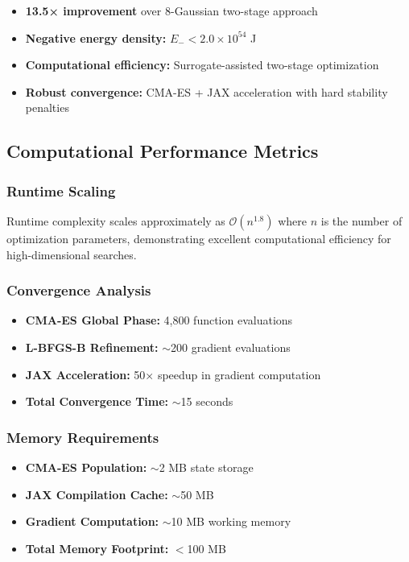 \documentclass[11pt]{article}
\begin{document}
\begin{itemize}
\item \textbf{13.5× improvement} over 8-Gaussian two-stage approach
\item \textbf{Negative energy density:} $E_- < 2.0\times10^{54}$ J
\item \textbf{Computational efficiency:} Surrogate-assisted two-stage optimization
\item \textbf{Robust convergence:} CMA-ES + JAX acceleration with hard stability penalties
\end{itemize}

\subsection*{Computational Performance Metrics}

\subsubsection*{Runtime Scaling}
Runtime complexity scales approximately as $\mathcal{O}(n^{1.8})$ where $n$ is the number of optimization parameters, demonstrating excellent computational efficiency for high-dimensional searches.

\subsubsection*{Convergence Analysis}
\begin{itemize}
\item \textbf{CMA-ES Global Phase:} 4,800 function evaluations
\item \textbf{L-BFGS-B Refinement:} $\sim$200 gradient evaluations
\item \textbf{JAX Acceleration:} 50× speedup in gradient computation
\item \textbf{Total Convergence Time:} $\sim$15 seconds
\end{itemize}

\subsubsection*{Memory Requirements}
\begin{itemize}
\item \textbf{CMA-ES Population:} $\sim$2 MB state storage
\item \textbf{JAX Compilation Cache:} $\sim$50 MB
\item \textbf{Gradient Computation:} $\sim$10 MB working memory
\item \textbf{Total Memory Footprint:} $<$100 MB
\end{itemize}
\end{document}
